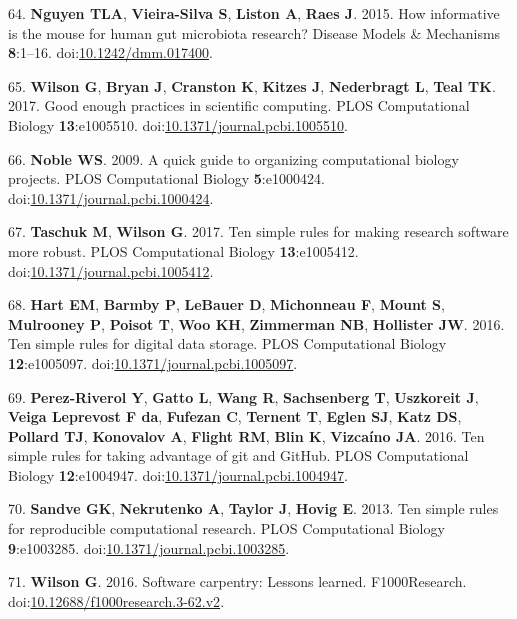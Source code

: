 \documentclass[]{article}
\begin{document}
\hypertarget{ref-Nguyen2015}{}
64. \textbf{Nguyen TLA}, \textbf{Vieira-Silva S}, \textbf{Liston A},
\textbf{Raes J}. 2015. How informative is the mouse for human gut
microbiota research? Disease Models \& Mechanisms \textbf{8}:1--16.
doi:\href{https://doi.org/10.1242/dmm.017400}{10.1242/dmm.017400}.

\hypertarget{ref-Wilson2017}{}
65. \textbf{Wilson G}, \textbf{Bryan J}, \textbf{Cranston K},
\textbf{Kitzes J}, \textbf{Nederbragt L}, \textbf{Teal TK}. 2017. Good
enough practices in scientific computing. PLOS Computational Biology
\textbf{13}:e1005510.
doi:\href{https://doi.org/10.1371/journal.pcbi.1005510}{10.1371/journal.pcbi.1005510}.

\hypertarget{ref-Noble2009}{}
66. \textbf{Noble WS}. 2009. A quick guide to organizing computational
biology projects. PLOS Computational Biology \textbf{5}:e1000424.
doi:\href{https://doi.org/10.1371/journal.pcbi.1000424}{10.1371/journal.pcbi.1000424}.

\hypertarget{ref-Taschuk2017}{}
67. \textbf{Taschuk M}, \textbf{Wilson G}. 2017. Ten simple rules for
making research software more robust. PLOS Computational Biology
\textbf{13}:e1005412.
doi:\href{https://doi.org/10.1371/journal.pcbi.1005412}{10.1371/journal.pcbi.1005412}.

\hypertarget{ref-Hart2016}{}
68. \textbf{Hart EM}, \textbf{Barmby P}, \textbf{LeBauer D},
\textbf{Michonneau F}, \textbf{Mount S}, \textbf{Mulrooney P},
\textbf{Poisot T}, \textbf{Woo KH}, \textbf{Zimmerman NB},
\textbf{Hollister JW}. 2016. Ten simple rules for digital data storage.
PLOS Computational Biology \textbf{12}:e1005097.
doi:\href{https://doi.org/10.1371/journal.pcbi.1005097}{10.1371/journal.pcbi.1005097}.

\hypertarget{ref-PerezRiverol2016}{}
69. \textbf{Perez-Riverol Y}, \textbf{Gatto L}, \textbf{Wang R},
\textbf{Sachsenberg T}, \textbf{Uszkoreit J}, \textbf{Veiga Leprevost F
da}, \textbf{Fufezan C}, \textbf{Ternent T}, \textbf{Eglen SJ},
\textbf{Katz DS}, \textbf{Pollard TJ}, \textbf{Konovalov A},
\textbf{Flight RM}, \textbf{Blin K}, \textbf{Vizcaíno JA}. 2016. Ten
simple rules for taking advantage of git and GitHub. PLOS Computational
Biology \textbf{12}:e1004947.
doi:\href{https://doi.org/10.1371/journal.pcbi.1004947}{10.1371/journal.pcbi.1004947}.

\hypertarget{ref-Sandve2013}{}
70. \textbf{Sandve GK}, \textbf{Nekrutenko A}, \textbf{Taylor J},
\textbf{Hovig E}. 2013. Ten simple rules for reproducible computational
research. PLOS Computational Biology \textbf{9}:e1003285.
doi:\href{https://doi.org/10.1371/journal.pcbi.1003285}{10.1371/journal.pcbi.1003285}.

\hypertarget{ref-Wilson2016}{}
71. \textbf{Wilson G}. 2016. Software carpentry: Lessons learned.
F1000Research.
doi:\href{https://doi.org/10.12688/f1000research.3-62.v2}{10.12688/f1000research.3-62.v2}.
\end{document}
